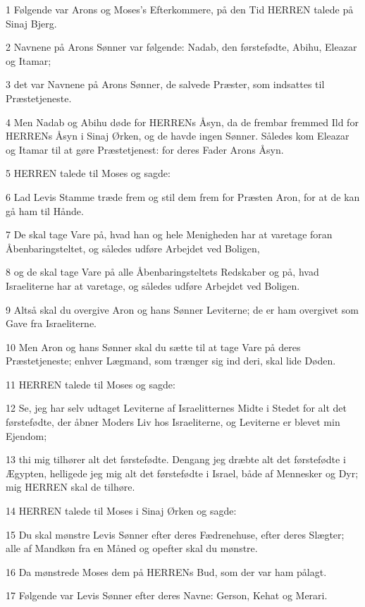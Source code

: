 \par 1 Følgende var Arons og Moses's Efterkommere, på den Tid HERREN talede på Sinaj Bjerg.
\par 2 Navnene på Arons Sønner var følgende: Nadab, den førstefødte, Abihu, Eleazar og Itamar;
\par 3 det var Navnene på Arons Sønner, de salvede Præster, som indsattes til Præstetjeneste.
\par 4 Men Nadab og Abihu døde for HERRENs Åsyn, da de frembar fremmed Ild for HERRENs Åsyn i Sinaj Ørken, og de havde ingen Sønner. Således kom Eleazar og Itamar til at gøre Præstetjenest: for deres Fader Arons Åsyn.
\par 5 HERREN talede til Moses og sagde:
\par 6 Lad Levis Stamme træde frem og stil dem frem for Præsten Aron, for at de kan gå ham til Hånde.
\par 7 De skal tage Vare på, hvad han og hele Menigheden har at varetage foran Åbenbaringsteltet, og således udføre Arbejdet ved Boligen,
\par 8 og de skal tage Vare på alle Åbenbaringsteltets Redskaber og på, hvad Israeliterne har at varetage, og således udføre Arbejdet ved Boligen.
\par 9 Altså skal du overgive Aron og hans Sønner Leviterne; de er ham overgivet som Gave fra Israeliterne.
\par 10 Men Aron og hans Sønner skal du sætte til at tage Vare på deres Præstetjeneste; enhver Lægmand, som trænger sig ind deri, skal lide Døden.
\par 11 HERREN talede til Moses og sagde:
\par 12 Se, jeg har selv udtaget Leviterne af Israelitternes Midte i Stedet for alt det førstefødte, der åbner Moders Liv hos Israeliterne, og Leviterne er blevet min Ejendom;
\par 13 thi mig tilhører alt det førstefødte. Dengang jeg dræbte alt det førstefødte i Ægypten, helligede jeg mig alt det førstefødte i Israel, både af Mennesker og Dyr; mig HERREN skal de tilhøre.
\par 14 HERREN talede til Moses i Sinaj Ørken og sagde:
\par 15 Du skal mønstre Levis Sønner efter deres Fædrenehuse, efter deres Slægter; alle af Mandkøn fra en Måned og opefter skal du mønstre.
\par 16 Da mønstrede Moses dem på HERRENs Bud, som der var ham pålagt.
\par 17 Følgende var Levis Sønner efter deres Navne: Gerson, Kehat og Merari.
